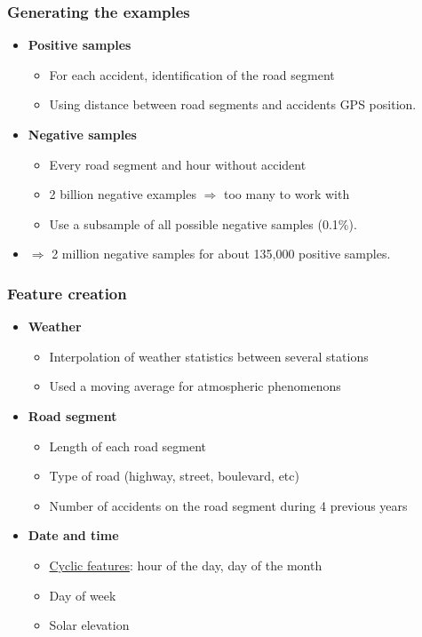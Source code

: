 \documentclass[slidestop,compress,red,mathserif]{beamer}
\begin{document}
\begin{frame}
	\frametitle{Generating the examples}
	\vfill
	\vfill
  \begin{itemize}
  \item[] \textbf{Positive samples}
    \begin{itemize}
      \item For each accident, identification of the road segment
      \item Using distance between road segments and accidents GPS position.
    \end{itemize}
  \item[] \textbf{Negative samples}
    \begin{itemize}
      \item Every road segment and hour without accident
      \item 2 billion negative examples $\Rightarrow$ too many to work with
      \item Use a subsample of all possible negative samples (0.1\%).
    \end{itemize}
  \vfill
  \item[] $\Rightarrow$ 2 million negative samples for about 135,000 positive samples.
    \end{itemize}
  \vfill
  \vfill
\end{frame}

\begin{frame}
	\frametitle{Feature creation}
	\vfill
	\begin{itemize}
    \item[] \textbf{Weather}
    \begin{itemize}
      \item Interpolation of weather statistics  between several stations
      \item Used a moving average for atmospheric phenomenons
    \end{itemize}
    \item[] \textbf{Road segment}
    \begin{itemize}
      \item Length of each road segment
      \item Type of road (highway, street, boulevard, etc)
      \item Number of accidents on the road segment during 4 previous years
    \end{itemize}
    \item[] \textbf{Date and time} \begin{itemize}
      \item \href{https://miro.medium.com/max/515/1*70cevmU8wNggGJEdLam1lw.png}{Cyclic features}: hour of the day, day of the month
      \item Day of week
      \item Solar elevation
    \end{itemize}
	\end{itemize}
	\vfill
\end{frame}
\end{document}
